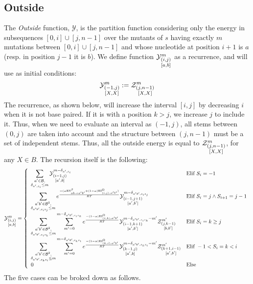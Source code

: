\subsection{Outside}	
The \emph{Outside} function, $\mathcal Y$, is the partition function considering only the 
energy in subsequences $[0,i]\cup[j,n-1]$ over the mutants of $s$ having exactly $m$ mutations between $[0,i]\cup[j,n-1]$ and whose nucleotide at position $i+1$ is $a$ 
(resp. in position $j-1$ it is $b$).
We define function $\Y{i,j}{m}{a,b}$ as a recurrence, and will use as initial conditions:
$$
	\Y{-1,j}{m}{X,X}:=
		\displaystyle
	  \Z{j,n-1}{m}{X,X}
$$
The recurrence, as shown below, will increase the interval $[i,j]$ by decreasing $i$ when
it is not base paired. If it is with a position $k>j$, we increase $j$ to include it.
 Thus, when we need
to evaluate an interval as $(-1,j)$, all stems between $(0,j)$ are taken into account and the
structure between $(j,n-1)$ must be a set of independent stems. Thus, all the outside energy is
equal to $\Z{j,n-1}{m}{X,X}$, for any $X\in B$. The recursion itself is the following:
$$
	\Y{i,j}{m}{a,b} = \left\{
  \begin{array}{ll}
		\displaystyle
    \sum_{\substack{a'\in \B,\\ \Kron_{a',s_i}\le m}}
    \Y{i-1,j}{m- \Kron_{a',s_i}}{a',b} &
    \text{Elif }S_i=-1 \\
    \displaystyle
    \sum_{\substack{a'b'\in \B^2,\\ \Kron_{a'b',s_is_j}\le m}}
		 e^{\frac{-(\alpha \text{ES}^\beta_{a b \to a' b'}+(1-\alpha)\text{EI}^{\Omega}_{(i,j),a'b'})}{RT}}
    \Y{i-1,j+1}{m- \Kron_{a'b',s_is_j}}{a',b'} &
   	 \text{Elif }S_{i}=j \land S_{i+1}=j-1\\
		 \displaystyle
		 \sum_{\substack{a'b'\in \B^2,\\ \Kron_{a'b',s_is_k}\le m}}
		 \sum_{m'=0}^{m-\Kron_{a'b',s_is_k}}
  		 e^{\frac{-(1-\alpha)\text{EI}^{\Omega}_{(i,k),a'b'}}{RT}}
		 \Y{i-1,k+1}{m- \Kron_{a'b',s_is_k} - m'}{a',b'}
     \Z{j,k-1}{m'}{b,b'} &
		 \text{Elif }S_{i}=k \geq j\\
		 \displaystyle
		 \sum_{\substack{a'b'\in \B^2,\\ \Kron_{a'b',s_ks_i}\le m}}
		 \sum_{m'=0}^{m-\Kron_{a'b',s_ks_i}}
   	 e^{\frac{-(1-\alpha)\text{EI}^{\Omega}_{(k,i),a'b'}}{RT}}
		 \Y{k-1,j}{m- \Kron_{a'b',s_ks_i} - m'}{a',b}
     \Z{k+1,i-1}{m'}{a',b'} &
		 \text{Elif }-1 < S_{i}=k < i\\
		 0 & \text{Else}
  \end{array}\right.
$$
The five cases can be broked down as follows.
